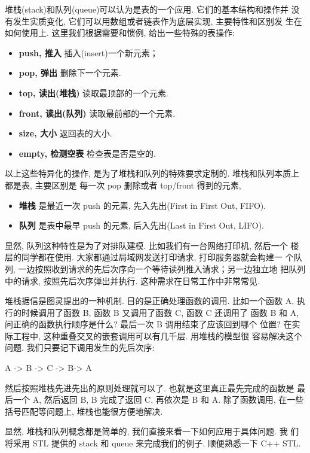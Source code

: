 \documentclass[a4paper]{ctexart}
\theoremstyle{definition}
\theoremstyle{definition}
\begin{document}
堆栈(stack)和队列(queue)可以认为是表的一个应用. 它们的基本结构和操作并
没有发生实质变化, 它们可以用数组或者链表作为底层实现, 主要特性和区别发
生在如何使用上. 这里我们根据需要和惯例, 给出一些特殊的表操作:

\begin{itemize}
  \item {\bf push, 推入} 插入(insert)一个新元素；
  \item {\bf pop, 弹出} 删除下一个元素. 
  \item {\bf top, 读出(堆栈)} 读取最顶部的一个元素.
  \item {\bf front, 读出(队列)} 读取最前部的一个元素.
  \item {\bf size, 大小} 返回表的大小.
  \item {\bf empty, 检测空表} 检查表是否是空的.
  
\end{itemize}

以上这些特异化的操作, 是为了堆栈和队列的特殊要求定制的. 堆栈和队列本质上都是表, 主要区别是
每一次 pop 删除或者 top/front 得到的元素,
\begin{itemize}
\item {\bf 堆栈} 是最近一次 push 的元素, 先入先出(First in First Out,
  FIFO).
\item {\bf 队列} 是表中最早 push 的元素, 后入先出(Last in First Out,
  LIFO).
\end{itemize}

显然, 队列这种特性是为了对排队建模. 比如我们有一台网络打印机, 然后一个
楼层的同学都在使用. 大家都通过局域网发送打印请求, 打印服务器就会构建一
个队列, 一边按照收到请求的先后次序向一个等待读列推入请求；另一边独立地
把队列中的请求, 按照先后次序弹出并执行. 这种需求在日常工作中非常常见.

堆栈据信是图灵提出的一种机制. 目的是正确处理函数的调用. 比如一个函数
A, 执行的时候调用了函数 B, 函数 B 又调用了函数 C, 函数 C 还调用了 函数
B 和 A, 问正确的函数执行顺序是什么? 最后一次 B 调用结束了应该回到哪个
位置? 在实际工程中, 这种重叠交叉的嵌套调用可以有几千层. 用堆栈的模型很
容易解决这个问题. 我们只要记下调用发生的先后次序:

\begin{center}
A -> B -> C -> B-> A
\end{center}

然后按照堆栈先进先出的原则处理就可以了. 也就是这里真正最先完成的函数是
最后一个 A, 然后返回 B, B 完成了返回 C, 再依次是 B 和 A. 除了函数调用,
在一些括号匹配等问题上, 堆栈也能很方便地解决.

显然, 堆栈和队列概念都是简单的, 我们直接来看一下如何应用于具体问题. 我
们将采用 STL 提供的 stack 和 queue 来完成我们的例子. 顺便熟悉一下 C++
STL.
\end{document}
